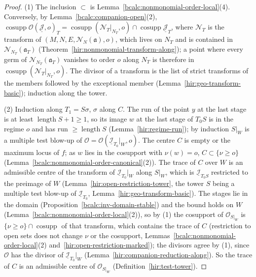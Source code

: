 \begin{proof}
\mixedleanok
(1) The inclusion \(\subset\) is Lemma~\ref{bcalc:nonmonomial-order-local}(4). Conversely, by Lemma~\ref{bcalc:companion-open}(2),
\(\operatorname{cosupp}\mathcal O(\underline{\mathcal J},o)_T=\operatorname{cosupp}(\mathcal N_T|_{N_T},o)\cap\operatorname{cosupp}\underline{\mathcal J}_T\), where \(\mathcal N_T\) is the
transform of \((M,N,E,\mathcal N_N(\mathfrak a),o)\), which lives on \(N_T\) and is contained in \(\mathcal N_{N_T}(\mathfrak a_T)\)
(Theorem~\ref{hir:nonmonomial-transform-along}); a point where every germ of \(\mathcal N_{N_T}(\mathfrak a_T)\) vanishes to order \(o\) along \(N_T\) is therefore in
\(\operatorname{cosupp}(\mathcal N_T|_{N_T},o)\). The divisor of a transform is the list of strict transforms of the members followed by the exceptional member
(Lemma~\ref{hir:geo-transform-basic}); induction along the tower.

(2) Induction along \(T_1=S\sigma\), \(\sigma\) along \(C\). The run of the point \(y\) at the last stage is at least \(\operatorname{length}S+1\ge1\), so its image
\(w\) at the last stage of \(T_0S\) is in the regime \(o\) and has run \(\ge\operatorname{length}S\) (Lemma~\ref{hir:regime-run}); by induction \(S|_W\) is a multiple test
blow-up of \(\mathcal O=\mathcal O(\underline{\mathcal I}_{T_0}|_W,o)\). The centre \(C\) is empty or the maximum locus of \(f\); as \(w\) lies in the cosupport with
\(\nu(w)=o\), \(C\subset\{\nu\ge o\}\) (Lemma~\ref{bcalc:nonmonomial-order-canonical}(2)). The trace of \(C\) over \(W\) is an admissible centre of the transform of
\(\underline{\mathcal I}_{T_0}|_W\) along \(S|_W\), which is \(\underline{\mathcal I}_{T_0S}\) restricted to the preimage of \(W\) (Lemma~\ref{hir:open-restriction-tower},
the tower \(S\) being a multiple test blow-up of \(\underline{\mathcal I}_{T_0}\), Lemma~\ref{hir:geo-transform-basic}). The stages lie in the domain
(Proposition~\ref{bcalc:inv-domain-stable}) and the bound holds on \(W\) (Lemma~\ref{bcalc:nonmonomial-order-local}(2)), so by (1) the cosupport of
\(\mathcal O_{S|_W}\) is \(\{\nu\ge o\}\cap\operatorname{cosupp}\) of that transform, which contains the trace of \(C\) (restriction to open sets does not change \(\nu\) or the
cosupport, Lemmas~\ref{bcalc:nonmonomial-order-local}(2) and~\ref{hir:open-restriction-marked}); the divisors agree by (1), since \(\mathcal O\) has the divisor of
\(\underline{\mathcal I}_{T_0}|_W\) (Lemma~\ref{hir:companion-reduction-along}). So the trace of \(C\) is an admissible centre of \(\mathcal O_{S|_W}\)
(Definition~\ref{hir:test-tower}).


\end{proof}
